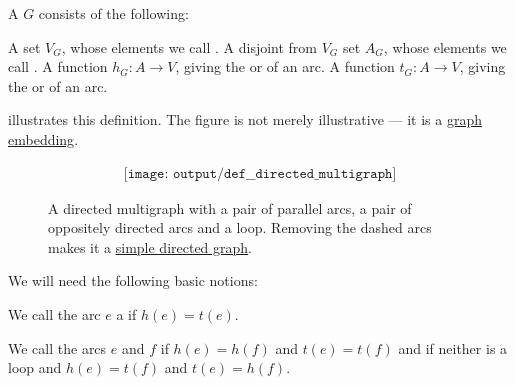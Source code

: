 \begin{definition}\label{def:directed_multigraph}
  A  \( G \) consists of the following:
  \begin{thmenum}[series=def:directed_multigraph]
     A set \( V_G \), whose elements we call .
     A disjoint from \( V_G \) set \( A_G \), whose elements we call .
     A function \( h_G: A \to V \), giving the  or  of an arc.
     A function \( t_G: A \to V \), giving the  or  of an arc.
  \end{thmenum}

   illustrates this definition. The figure is not merely illustrative --- it is a \hyperref[def:graph_geometric_realization/embedding]{graph embedding}.

  \begin{figure}[!ht]
    \begin{equation}\label{eq:fig:def:directed_multigraph}
      \begin{aligned}
        \texttt{[image: output/def\_\_directed\_multigraph]}
      \end{aligned}
    \end{equation}
    \caption{A directed multigraph with a pair of parallel arcs, a pair of oppositely directed arcs and a loop. Removing the dashed arcs makes it a \hyperref[def:directed_graph]{simple directed graph}.}\label{fig:def:directed_multigraph}
  \end{figure}

  We will need the following basic notions:
  \begin{thmenum}[resume=def:directed_multigraph]
     We call the arc \( e \) a  if \( h(e) = t(e) \).

    \medskip

     We call the arcs \( e \) and \( f \)  if \( h(e) = h(f) \) and \( t(e) = t(f) \) and  if neither is a loop and \( h(e) = t(f) \) and \( t(e) = h(f) \).


\end{thmenum}
\end{definition}
